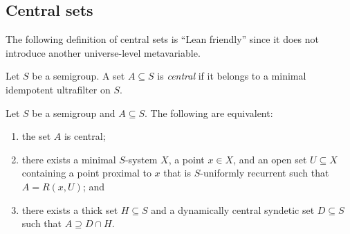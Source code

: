 \subsection{Central sets}

The following definition of central sets is ``Lean friendly'' since it does not introduce another universe-level metavariable.

\begin{definition}
    Let $S$ be a semigroup.  A set $A \subseteq S$ is \emph{central} if it belongs to a minimal idempotent ultrafilter on $S$.
\end{definition}

\begin{theorem}
    Let $S$ be a semigroup and $A \subseteq S$.  The following are equivalent:
    \begin{enumerate}
        \item
        \label{item_minidemp_central}
        the set $A$ is central;

        \item 
        \label{item_f_central}
        there exists a minimal $S$-system $X$, a point $x \in X$, and an open set $U \subseteq X$ containing a point proximal to $x$ that is $S$-uniformly recurrent such that $A = R(x,U)$; and 

        \item
        \label{item_dcscapthick_central}
        there exists a thick set $H \subseteq S$ and a dynamically central syndetic set $D \subseteq S$ such that $A \supseteq D \cap H$.
    \end{enumerate}
\end{theorem}


